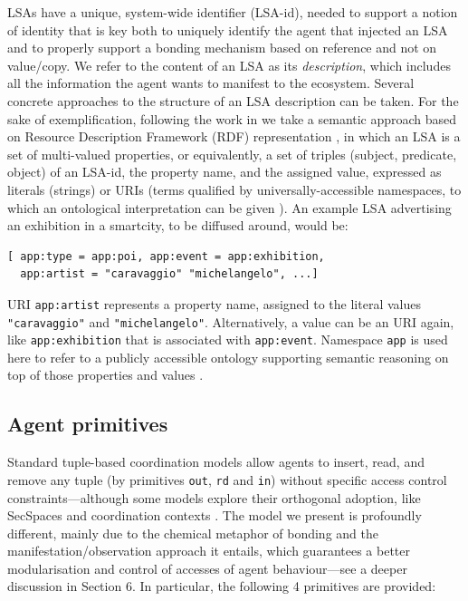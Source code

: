 \documentclass[12pt,a4paper,twoside,openright]{book}
\begin{document}
LSAs have a unique, system-wide identifier (LSA-id), needed to support a notion of identity that is key both to uniquely identify the agent that injected an LSA and to properly support a bonding mechanism based on reference and not on value/copy. We refer to the content of an LSA as its \emph{description}, which includes all the information the agent wants to manifest to the ecosystem.
%
Several concrete approaches to the structure of an LSA description can be taken.
%
For the sake of exemplification, following the work in \cite{SemanticSapereIGI2012,sapereecolaws-sac2012,SemMatchingSAC2013} we  take a semantic approach based on Resource Description Framework (RDF) representation \cite{manola2004primer}, in which an LSA is a set of multi-valued properties, or equivalently, a set of triples (subject, predicate, object) of an LSA-id, the property name, and the assigned value, expressed as literals (strings) or URIs (terms qualified by universally-accessible namespaces, to which an ontological interpretation can be given \cite{ranganathan2004ontologies}).
%
An example LSA advertising an exhibition in a smartcity, to be diffused around, would be: 

{\begin{Verbatim}[samepage=true,frame=single,commandchars=\\\{\}]
[ app:type = app:poi, app:event = app:exhibition,
  app:artist = "caravaggio" "michelangelo", ...]
\end{Verbatim}
}

\noindent URI \texttt{app:artist} represents a property name, assigned to the literal values \mbox{\texttt{"caravaggio"}} and \mbox{\texttt{"michelangelo"}}. Alternatively, a value can be an URI again, like \texttt{app:exhibition} that is associated with \texttt{app:event}. Namespace \texttt{app} is used here to refer to a publicly accessible ontology supporting semantic reasoning on top of those properties and values \cite{SemMatchingSAC2013}.

\subsection{Agent primitives}\label{s:agent}

Standard tuple-based coordination models allow agents to insert, read, and remove any tuple (by primitives \texttt{out}, \texttt{rd} and \texttt{in}) without specific access control constraints---although some models explore their orthogonal adoption, like SecSpaces \cite{GorrieriLZ06} and coordination contexts \cite{J-ORV-AAECC2005,RVO-ATAI2004}.
%
The model we present is profoundly different, mainly due to the chemical metaphor of bonding and the manifestation/observation approach it entails, which guarantees a better modularisation and control of accesses of agent behaviour---see a deeper discussion in Section 6.
%
In particular, the following 4 primitives are provided:
\end{document}
